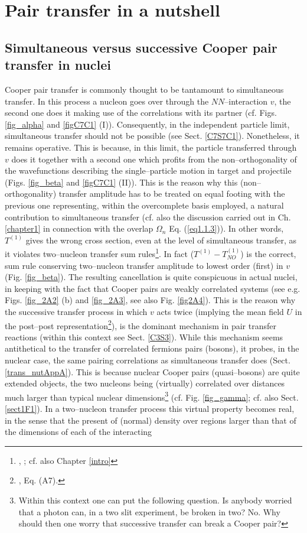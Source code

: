 \chapter[Simultaneous versus successive transfer]{Pair transfer in a nutshell}\label{chapter2}
\section{Simultaneous versus successive Cooper pair transfer in nuclei}\label{C2S1}
Cooper pair transfer is commonly thought to be tantamount to simultaneous transfer. In this process a nucleon goes over through the $NN$--interaction $v$, the second one does it making use of the correlations with its partner (cf. Figs. \ref{fig_alpha} and \ref{figC7C1} (I)). Consequently, in the independent particle limit, simultaneous  transfer should not be possible (see Sect. \ref{C7S7C1}). Nonetheless, it remains operative. This is because, in this limit, the particle transferred through $v$ does it together with a second one which profits from the non--orthogonality of the wavefunctions describing the single--particle motion in target and projectile (Figs. \ref{fig_beta} and \ref{figC7C1} (II)). This is the reason why this (non--orthogonality) transfer amplitude has to be treated on equal footing with  the previous one  representing, within the overcomplete basis employed, a natural contribution to simultaneous transfer (cf. also the discussion carried out in Ch.\ref{chapter1} in connection with the overlap $\Omega_n$ Eq. (\ref{eq1.1.3})). In other words, $T^{(1)}$ gives the wrong cross section, even at the level of simultaneous transfer, as it violates two--nucleon transfer sum rules\footnote{\cite{Broglia:72b}, \cite{Bayman:72}; cf. also Chapter \ref{intro}}. In fact ($T^{(1)}-T^{(1)}_{NO}$) is the correct, sum rule conserving two--nucleon transfer amplitude to lowest order (first) in $v$ (Fig. \ref{fig_beta}). The resulting cancellation is quite conspicuous in actual nuclei, in keeping with the fact that Cooper pairs are weakly correlated systems (see e.g. Figs. \ref{fig_2A2} (b) and \ref{fig_2A3}, see also Fig. \ref{fig2A4}). This is the reason why the successive transfer process in which $v$ acts twice (implying the mean field $U$ in the post--post representation\footnote{\cite{Potel:13}, Eq. (A7).}), is the dominant mechanism in pair transfer reactions (within this context see Sect. \ref{C3S3}). While this mechanism seems antithetical to the transfer of  correlated fermions pairs (bosons), it probes, in the nuclear case, the same pairing correlations as simultaneous transfer does (Sect. \ref{trans_nutAppA}). This is because nuclear Cooper pairs (quasi--bosons) are quite extended objects, the two nucleons being (virtually) correlated over distances much larger than typical nuclear dimensions\footnote{Within this context one can put the following question. Is anybody worried that a photon can, in a two slit experiment, be broken in two? No. Why should then one worry that successive transfer can break a Cooper pair?} (cf. Fig. \ref{fig_gamma}; cf. also Sect. \ref{sect1F1}). In a two--nucleon transfer process this virtual property becomes real, in the sense that the present of (normal) density over regions larger than that of the dimensions of each of the interacting 